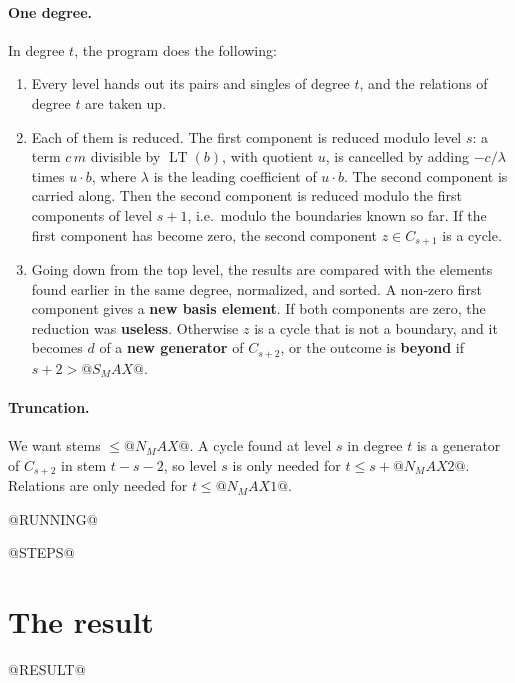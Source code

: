 \documentclass[11pt]{article}
\DeclareMathOperator{\LT}{LT}
\begin{document}
\paragraph{One degree.}
In degree $t$, the program does the following:
\begin{enumerate}
\item Every level hands out its pairs and singles of degree $t$, and the relations of degree
  $t$ are taken up.
\item Each of them is reduced. The first component is reduced modulo level $s$: a term
  $c\,m$ divisible by $\LT(b)$, with quotient $u$, is cancelled by adding $-c/\lambda$ times
  $u \cdot b$, where $\lambda$ is the leading coefficient of $u \cdot b$. The second component
  is carried along. Then the second component is reduced modulo the first components of level
  $s+1$, i.e.\ modulo the boundaries known so far. If the first component has become zero, the
  second component $z \in C_{s+1}$ is a cycle.
\item Going down from the top level, the results are compared with the elements found earlier
  in the same degree, normalized, and sorted. A non-zero first component gives a \textbf{new
  basis element}. If both components are zero, the reduction was \textbf{useless}. Otherwise
  $z$ is a cycle that is not a boundary, and it becomes $d$ of a \textbf{new generator} of
  $C_{s+2}$, or the outcome is \textbf{beyond} if $s + 2 > @S_MAX@$.
\end{enumerate}

\paragraph{Truncation.}
We want stems $\le @N_MAX@$. A cycle found at level $s$ in degree $t$ is a generator of $C_{s+2}$ in
stem $t-s-2$, so level $s$ is only needed for $t \le s + @N_MAX2@$. Relations are only needed for
$t \le @N_MAX1@$.

@RUNNING@

@STEPS@
\section{The result}

@RESULT@
\end{document}
